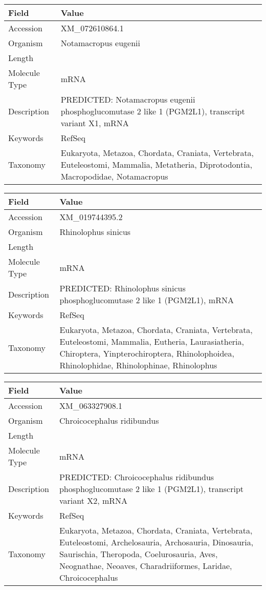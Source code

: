 \documentclass[10pt]{article}
\begin{document}
\vspace{1em}
{\footnotesize
\begin{longtable}{>{\raggedright\arraybackslash}p{4.5cm} >{\raggedright\arraybackslash}p{11.5cm}}
\textbf{Field} & \textbf{Value} \\
\hline
Accession & XM\_072610864.1 \\
Organism & Notamacropus eugenii \\
Length & 10310 \\
Molecule Type & mRNA \\
Description & PREDICTED: Notamacropus eugenii phosphoglucomutase 2 like 1 (PGM2L1), transcript variant X1, mRNA \\
Keywords & RefSeq \\
Taxonomy & Eukaryota, Metazoa, Chordata, Craniata, Vertebrata, Euteleostomi, Mammalia, Metatheria, Diprotodontia, Macropodidae, Notamacropus \\
\end{longtable}
}

\vspace{1em}
{\footnotesize
\begin{longtable}{>{\raggedright\arraybackslash}p{4.5cm} >{\raggedright\arraybackslash}p{11.5cm}}
\textbf{Field} & \textbf{Value} \\
\hline
Accession & XM\_019744395.2 \\
Organism & Rhinolophus sinicus \\
Length & 7753 \\
Molecule Type & mRNA \\
Description & PREDICTED: Rhinolophus sinicus phosphoglucomutase 2 like 1 (PGM2L1), mRNA \\
Keywords & RefSeq \\
Taxonomy & Eukaryota, Metazoa, Chordata, Craniata, Vertebrata, Euteleostomi, Mammalia, Eutheria, Laurasiatheria, Chiroptera, Yinpterochiroptera, Rhinolophoidea, Rhinolophidae, Rhinolophinae, Rhinolophus \\
\end{longtable}
}

\vspace{1em}
{\footnotesize
\begin{longtable}{>{\raggedright\arraybackslash}p{4.5cm} >{\raggedright\arraybackslash}p{11.5cm}}
\textbf{Field} & \textbf{Value} \\
\hline
Accession & XM\_063327908.1 \\
Organism & Chroicocephalus ridibundus \\
Length & 6494 \\
Molecule Type & mRNA \\
Description & PREDICTED: Chroicocephalus ridibundus phosphoglucomutase 2 like 1 (PGM2L1), transcript variant X2, mRNA \\
Keywords & RefSeq \\
Taxonomy & Eukaryota, Metazoa, Chordata, Craniata, Vertebrata, Euteleostomi, Archelosauria, Archosauria, Dinosauria, Saurischia, Theropoda, Coelurosauria, Aves, Neognathae, Neoaves, Charadriiformes, Laridae, Chroicocephalus \\
\end{longtable}
}
\end{document}
